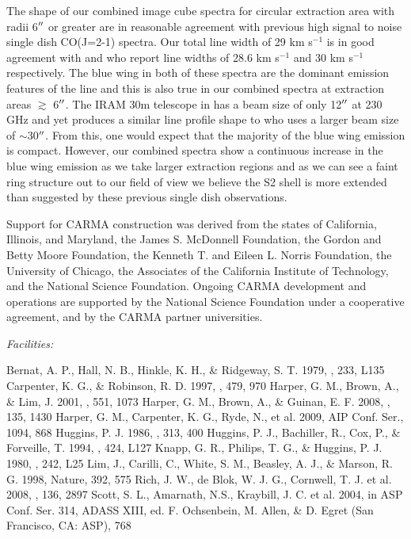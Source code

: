 \documentclass[manuscript]{aastex}
\begin{document}
The shape of our combined image cube spectra for circular extraction area with radii 6$\mbox{$^{\prime\prime}$}$ or greater are in reasonable agreement with previous high signal to noise single dish CO(J=2-1) spectra. Our total line width of 29 km s${}^{-1}$ is in good agreement with \cite{hugg86} and \cite{hugg94} who report line widths of 28.6 km s${}^{-1}$ and 30 km s${}^{-1}$ respectively. The blue wing in both of these spectra are the dominant emission features of the line and this is also true in our combined spectra at extraction areas $\gtrsim$ 6$\mbox{$^{\prime\prime}$}$. The IRAM 30m telescope in \cite{hugg94} has a beam size of only 12$\mbox{$^{\prime\prime}$}$ at 230 GHz and yet produces a similar line profile shape to \cite{hugg86} who uses a larger beam size of $\sim$30$\mbox{$^{\prime\prime}$}$. From this, one would expect that the majority of the blue wing emission is compact. However, our combined spectra show a continuous increase in the blue wing emission as we take larger extraction regions and as we can see a faint ring structure out to our field of view we believe the S2 shell is more extended than suggested by these previous single dish observations.

\acknowledgments

Support for CARMA construction was derived from the states of California, Illinois, and
Maryland, the James S. McDonnell Foundation, the Gordon and Betty Moore Foundation, the
Kenneth T. and Eileen L. Norris Foundation, the University of Chicago, the Associates of the
California Institute of Technology, and the National Science Foundation. Ongoing CARMA
development and operations are supported by the National Science Foundation under a
cooperative agreement, and by the CARMA partner universities.

{\it Facilities:} 

\begin{thebibliography}{}
 Bernat, A. P., Hall, N. B., Hinkle, K. H., \& Ridgeway, S. T. 1979, \apj, 233, L135
 Carpenter, K. G., \& Robinson, R. D. 1997, \apj, 479, 970
 Harper, G. M., Brown, A., \& Lim, J. 2001, \apj, 551, 1073
 Harper, G. M., Brown, A., \& Guinan, E. F. 2008, \aj, 135, 1430
 Harper, G. M., Carpenter, K. G., Ryde, N., et al. 2009, AIP Conf. Ser., 1094, 868
 Huggins, P. J. 1986, \apj, 313, 400
 Huggins, P. J., Bachiller, R., Cox, P., \& Forveille, T. 1994, \apj, 424, L127
 Knapp, G. R., Philips, T. G., \& Huggins, P. J. 1980, \apj, 242, L25
 Lim, J., Carilli, C., White, S. M., Beasley, A. J., & Marson, R. G. 1998, Nature, 392, 575
 Rich, J. W., de Blok, W. J. G., Cornwell, T. J. et al. 2008, \aj, 136, 2897
 Scott, S. L., Amarnath, N.S., Kraybill, J. C. et al. 2004, in ASP Conf. Ser. 314, ADASS XIII, ed. F. Ochsenbein, M. Allen, & D. Egret (San Francisco, CA: ASP), 768
\end{thebibliography}
\end{document}

